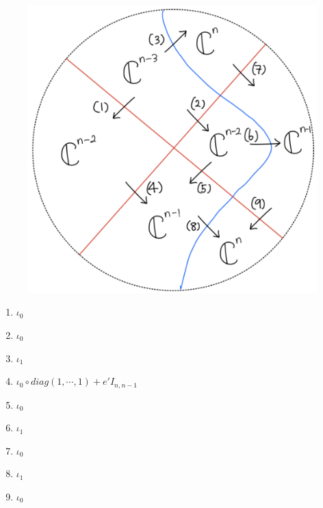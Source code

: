\begin{figure}[H]
    \centering
    \includegraphics[scale = 0.45]{diagrams/cobord'4/21.png}
    \caption{}
    \label{fig:your-label}
\end{figure}
\begin{enumerate}[label = (\arabic*)]
\item $\iota_0$

\item $\iota_0$

\item $\iota_1$

\item $\iota_0 \circ diag(1,\cdots,1)+e'I_{n,n-1}$

\item $\iota_0$

\item $\iota_1$

\item $\iota_0$

\item $\iota_1$

\item $\iota_0$
\end{enumerate}

